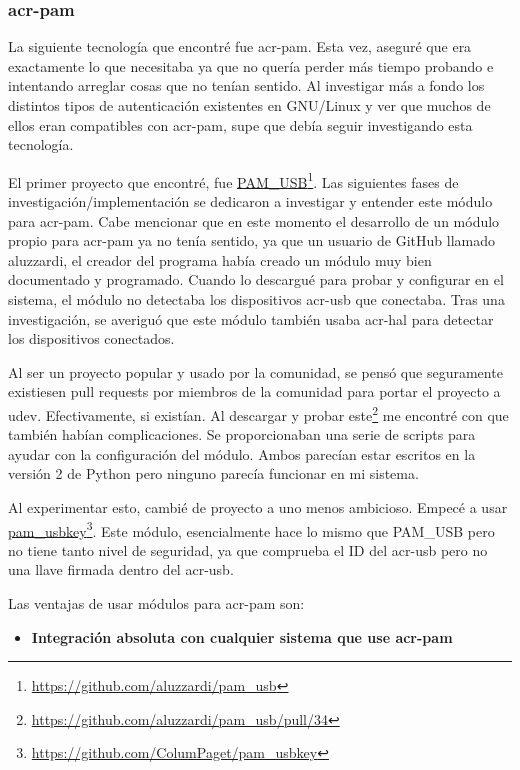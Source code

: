 \documentclass[twoside, titlepage, 12pt, a4paper]{article}
\begin{document}
{\subsubsection{\gls{acr-pam}}
La siguiente tecnología que encontré fue \gls{acr-pam}. Esta vez, aseguré que era exactamente lo que necesitaba ya que no quería perder más tiempo probando e intentando arreglar cosas que no tenían sentido. Al investigar más a fondo los distintos tipos de autenticación existentes en \gls{GNU/Linux} y ver que muchos de ellos eran compatibles con \gls{acr-pam}, supe que debía seguir investigando esta tecnología. \par
El primer proyecto que encontré, fue \href{https://github.com/aluzzardi/pam_usb}{PAM\_USB}\footnote{\url{https://github.com/aluzzardi/pam_usb}}. Las siguientes fases de investigación/implementación se dedicaron a investigar y entender este módulo para \gls{acr-pam}. Cabe mencionar que en este momento el desarrollo de un módulo propio para \gls{acr-pam} ya no tenía sentido, ya que un usuario de \gls{GitHub} llamado aluzzardi, el creador del programa había creado un módulo muy bien documentado y programado. Cuando lo descargué para probar y configurar en el sistema, el módulo no detectaba los dispositivos \gls{acr-usb} que conectaba. Tras una investigación, se averiguó que este módulo también usaba \gls{acr-hal} para detectar los dispositivos conectados.\par
Al ser un proyecto popular y usado por la comunidad, se pensó que seguramente existiesen pull requests por miembros de la comunidad para portar el proyecto a \gls{udev}. Efectivamente, si existían. Al descargar y probar este\footnote{\url{https://github.com/aluzzardi/pam_usb/pull/34}} me encontré con que también habían complicaciones. Se proporcionaban una serie de scripts para ayudar con la configuración del módulo. Ambos parecían estar escritos en la versión 2 de Python pero ninguno parecía funcionar en mi sistema.\par Al experimentar esto, cambié de proyecto a uno menos ambicioso. Empecé a usar \href{https://github.com/ColumPaget/pam_usbkey}{pam\_usbkey}\footnote{\url{https://github.com/ColumPaget/pam_usbkey}}. Este módulo, esencialmente hace lo mismo que PAM\_USB pero no tiene tanto nivel de seguridad, ya que comprueba el ID del \gls{acr-usb} pero no una llave firmada dentro del \gls{acr-usb}. \par
Las ventajas de usar módulos para \gls{acr-pam} son:
\begin{itemize}
	\item{\textbf{Integración absoluta con cualquier sistema que use \gls{acr-pam}}}\par

\end{itemize}}
\end{document}
